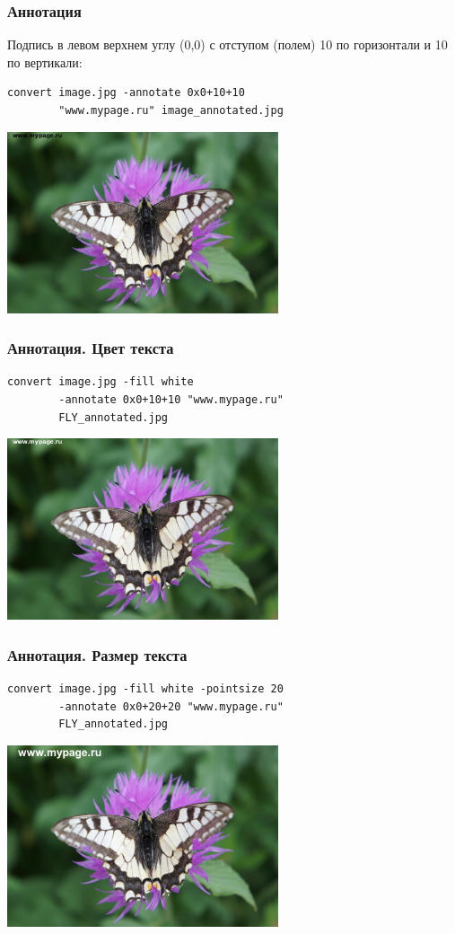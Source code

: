 \documentclass[11pt, compress]{beamer}
\begin{document}
\begin{frame}[c, fragile]
\frametitle{Аннотация}
Подпись в левом верхнем углу (0,0) с отступом (полем) 10 по горизонтали и 10 по вертикали:
\begin{lstlisting}
convert image.jpg -annotate 0x0+10+10 
        "www.mypage.ru" image_annotated.jpg
\end{lstlisting}
{\centering
\includegraphics[width=0.6\textwidth]{FLY_annotated1.jpg}
}
\end{frame}

\begin{frame}[c, fragile]
\frametitle{Аннотация. Цвет текста}
\begin{lstlisting}
convert image.jpg -fill white 
        -annotate 0x0+10+10 "www.mypage.ru" 
        FLY_annotated.jpg
\end{lstlisting}
\includegraphics[width=0.6\textwidth]{FLY_annotated2.jpg}
\end{frame}

\begin{frame}[c, fragile]
\frametitle{Аннотация. Размер текста}
\begin{lstlisting}
convert image.jpg -fill white -pointsize 20
        -annotate 0x0+20+20 "www.mypage.ru" 
        FLY_annotated.jpg
\end{lstlisting}
\includegraphics[width=0.6\textwidth]{FLY_annotated3.jpg}
\end{frame}
\end{document}
